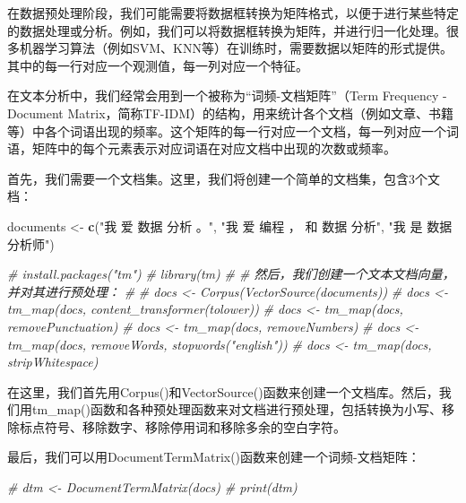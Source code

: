\documentclass[]{book}
\newenvironment{Shaded}{\begin{snugshade}}{\end{snugshade}}
\newcommand{\CommentTok}[1]{\textcolor[rgb]{0.56,0.35,0.01}{\textit{#1}}}
\newcommand{\KeywordTok}[1]{\textcolor[rgb]{0.13,0.29,0.53}{\textbf{#1}}}
\newcommand{\NormalTok}[1]{#1}
\newcommand{\StringTok}[1]{\textcolor[rgb]{0.31,0.60,0.02}{#1}}
\begin{document}
在数据预处理阶段，我们可能需要将数据框转换为矩阵格式，以便于进行某些特定的数据处理或分析。例如，我们可以将数据框转换为矩阵，并进行归一化处理。很多机器学习算法（例如SVM、KNN等）在训练时，需要数据以矩阵的形式提供。其中的每一行对应一个观测值，每一列对应一个特征。

在文本分析中，我们经常会用到一个被称为``词频-文档矩阵''（Term Frequency - Document Matrix，简称TF-IDM）的结构，用来统计各个文档（例如文章、书籍等）中各个词语出现的频率。这个矩阵的每一行对应一个文档，每一列对应一个词语，矩阵中的每个元素表示对应词语在对应文档中出现的次数或频率。

首先，我们需要一个文档集。这里，我们将创建一个简单的文档集，包含3个文档：

\begin{Shaded}
\begin{Highlighting}[]
\NormalTok{documents <-}\StringTok{ }\KeywordTok{c}\NormalTok{(}\StringTok{"我 爱 数据 分析 。"}\NormalTok{,}
               \StringTok{"我 爱 编程 ， 和 数据 分析"}\NormalTok{,}
               \StringTok{"我 是 数据 分析师"}\NormalTok{)}
\end{Highlighting}
\end{Shaded}

\begin{Shaded}
\begin{Highlighting}[]
\CommentTok{# install.packages("tm")}
\CommentTok{# library(tm)}
\CommentTok{# # 然后，我们创建一个文本文档向量，并对其进行预处理：}
\CommentTok{# }
\CommentTok{# docs <- Corpus(VectorSource(documents))}
\CommentTok{# docs <- tm_map(docs, content_transformer(tolower))}
\CommentTok{# docs <- tm_map(docs, removePunctuation)}
\CommentTok{# docs <- tm_map(docs, removeNumbers)}
\CommentTok{# docs <- tm_map(docs, removeWords, stopwords("english"))}
\CommentTok{# docs <- tm_map(docs, stripWhitespace)}
\end{Highlighting}
\end{Shaded}

在这里，我们首先用Corpus()和VectorSource()函数来创建一个文档库。然后，我们用tm\_map()函数和各种预处理函数来对文档进行预处理，包括转换为小写、移除标点符号、移除数字、移除停用词和移除多余的空白字符。

最后，我们可以用DocumentTermMatrix()函数来创建一个词频-文档矩阵：

\begin{Shaded}
\begin{Highlighting}[]
\CommentTok{# dtm <- DocumentTermMatrix(docs)}
\CommentTok{# print(dtm)}
\end{Highlighting}
\end{Shaded}
\end{document}
